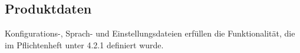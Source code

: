 \documentclass[parskip=full]{scrartcl}
\begin{document}
	\subsection{Produktdaten}
	Konfigurations-, Sprach- und Einstellungsdateien erfüllen die Funktionalität, die im Pflichtenheft unter 4.2.1 definiert wurde.
%		
%		
%			
%			
			
			 
\end{document}
